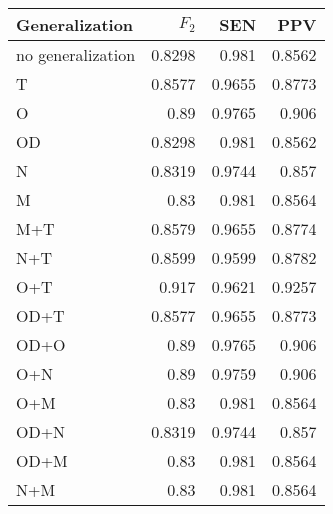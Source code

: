 \begin{table}[htbp]
  \caption{}
  \label{tab:}
  \centering
  \begin{tabular}[h]{@{}lrrr@{}}
    \toprule
    Generalization & \(F_2\) & SEN & PPV \\
    \midrule
no generalization	&	0.8298	&	0.981	&	0.8562 \\
T	&	0.8577	&	0.9655	&	0.8773 \\
O	&	0.89	&	0.9765	&	0.906 \\
OD	&	0.8298	&	0.981	&	0.8562 \\
N	&	0.8319	&	0.9744	&	0.857 \\
M	&	0.83	&	0.981	&	0.8564 \\
M+T	&	0.8579	&	0.9655	&	0.8774 \\
N+T	&	0.8599	&	0.9599	&	0.8782 \\
O+T	&	0.917	&	0.9621	&	0.9257 \\
OD+T	&	0.8577	&	0.9655	&	0.8773 \\
OD+O	&	0.89	&	0.9765	&	0.906 \\
O+N	&	0.89	&	0.9759	&	0.906 \\
O+M	&	0.83	&	0.981	&	0.8564 \\
OD+N	&	0.8319	&	0.9744	&	0.857 \\
OD+M	&	0.83	&	0.981	&	0.8564 \\
N+M	&	0.83	&	0.981	&	0.8564 \\
    \bottomrule
  \end{tabular}
\end{table}
